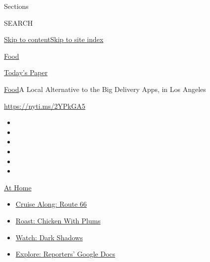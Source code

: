 Sections

SEARCH

\protect\hyperlink{site-content}{Skip to
content}\protect\hyperlink{site-index}{Skip to site index}

\href{https://www.nytimes3xbfgragh.onion/section/food}{Food}

\href{https://myaccount.nytimes3xbfgragh.onion/auth/login?response_type=cookie\&client_id=vi}{}

\href{https://www.nytimes3xbfgragh.onion/section/todayspaper}{Today's
Paper}

\href{/section/food}{Food}\textbar{}A Local Alternative to the Big
Delivery Apps, in Los Angeles

\url{https://nyti.ms/2YPkGA5}

\begin{itemize}
\item
\item
\item
\item
\item
\item
\end{itemize}

\href{https://www.nytimes3xbfgragh.onion/spotlight/at-home?action=click\&pgtype=Article\&state=default\&region=TOP_BANNER\&context=at_home_menu}{At
Home}

\begin{itemize}
\tightlist
\item
  \href{https://www.nytimes3xbfgragh.onion/2020/09/07/travel/route-66.html?action=click\&pgtype=Article\&state=default\&region=TOP_BANNER\&context=at_home_menu}{Cruise
  Along: Route 66}
\item
  \href{https://www.nytimes3xbfgragh.onion/2020/09/04/dining/sheet-pan-chicken.html?action=click\&pgtype=Article\&state=default\&region=TOP_BANNER\&context=at_home_menu}{Roast:
  Chicken With Plums}
\item
  \href{https://www.nytimes3xbfgragh.onion/2020/09/04/arts/television/dark-shadows-stream.html?action=click\&pgtype=Article\&state=default\&region=TOP_BANNER\&context=at_home_menu}{Watch:
  Dark Shadows}
\item
  \href{https://www.nytimes3xbfgragh.onion/interactive/2020/at-home/even-more-reporters-editors-diaries-lists-recommendations.html?action=click\&pgtype=Article\&state=default\&region=TOP_BANNER\&context=at_home_menu}{Explore:
  Reporters' Google Docs}
\end{itemize}

